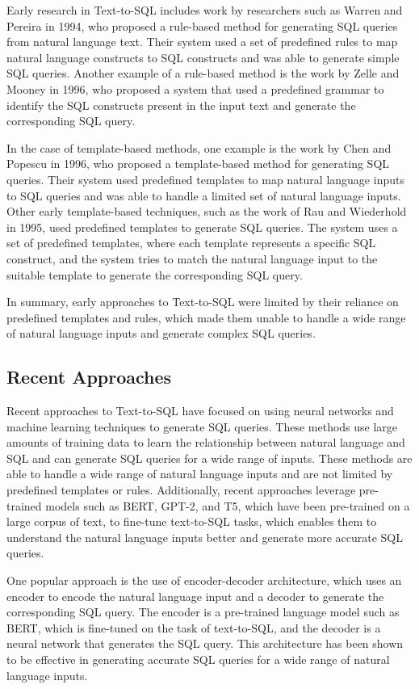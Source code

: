 Early research in Text-to-SQL includes work by researchers such as Warren and Pereira in 1994, who proposed a rule-based method for generating SQL queries from natural language text. Their system used a set of predefined rules to map natural language constructs to SQL constructs and was able to generate simple SQL queries.
Another example of a rule-based method is the work by Zelle and Mooney in 1996, who proposed a system that used a predefined grammar to identify the SQL constructs present in the input text and generate the corresponding SQL query.

In the case of template-based methods, one example is the work by Chen and Popescu in 1996, who proposed a template-based method for generating SQL queries. Their system used predefined templates to map natural language inputs to SQL queries and was able to handle a limited set of natural language inputs.
Other early template-based techniques, such as the work of Rau and Wiederhold in 1995, used predefined templates to generate SQL queries. The system uses a set of predefined templates, where each template represents a specific SQL construct, and the system tries to match the natural language input to the suitable template to generate the corresponding SQL query.

In summary, early approaches to Text-to-SQL were limited by their reliance on predefined templates and rules, which made them unable to handle a wide range of natural language inputs and generate complex SQL queries.

\subsection{Recent Approaches}

Recent approaches to Text-to-SQL have focused on using neural networks and machine learning techniques to generate SQL queries. These methods use large amounts of training data to learn the relationship between natural language and SQL and can generate SQL queries for a wide range of inputs. These methods are able to handle a wide range of natural language inputs and are not limited by predefined templates or rules. Additionally, recent approaches leverage pre-trained models such as BERT, GPT-2, and T5, which have been pre-trained on a large corpus of text, to fine-tune text-to-SQL tasks, which enables them to understand the natural language inputs better and generate more accurate SQL queries.

One popular approach is the use of encoder-decoder architecture, which uses an encoder to encode the natural language input and a decoder to generate the corresponding SQL query. The encoder is a pre-trained language model such as BERT, which is fine-tuned on the task of text-to-SQL, and the decoder is a neural network that generates the SQL query. This architecture has been shown to be effective in generating accurate SQL queries for a wide range of natural language inputs.

